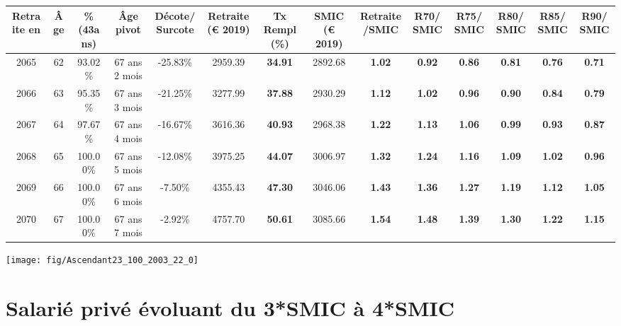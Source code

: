 \begin{adjustbox}{max width=\textwidth} 
\begin{tabular}[htb]{|c|c||c|c|c||c|c||c|c||c|c|c|c|c|} 
\hline 
 Retraite en &  Âge &  \%(43ans) &  Âge pivot &  Décote/Surcote &  Retraite (\euro{} 2019) &  Tx Rempl(\%) &  SMIC (\euro{} 2019) &  Retraite/SMIC &  R70/SMIC &  R75/SMIC &  R80/SMIC &  R85/SMIC &  R90/SMIC \\ 
\hline \hline 
 2065 &  62 &  93.02\% &  67 ans 2 mois &  -25.83\% &  2959.39 &  {\bf 34.91} &  2892.68 &  {\bf 1.02} &  {\bf {\color{red} 0.92}} &  {\bf {\color{red} 0.86}} &  {\bf {\color{red} 0.81}} &  {\bf {\color{red} 0.76}} &  {\bf {\color{red} 0.71}} \\ 
\hline 
 2066 &  63 &  95.35\% &  67 ans 3 mois &  -21.25\% &  3277.99 &  {\bf 37.88} &  2930.29 &  {\bf 1.12} &  {\bf 1.02} &  {\bf {\color{red} 0.96}} &  {\bf {\color{red} 0.90}} &  {\bf {\color{red} 0.84}} &  {\bf {\color{red} 0.79}} \\ 
\hline 
 2067 &  64 &  97.67\% &  67 ans 4 mois &  -16.67\% &  3616.36 &  {\bf 40.93} &  2968.38 &  {\bf 1.22} &  {\bf 1.13} &  {\bf 1.06} &  {\bf {\color{red} 0.99}} &  {\bf {\color{red} 0.93}} &  {\bf {\color{red} 0.87}} \\ 
\hline 
 2068 &  65 &  100.00\% &  67 ans 5 mois &  -12.08\% &  3975.25 &  {\bf 44.07} &  3006.97 &  {\bf 1.32} &  {\bf 1.24} &  {\bf 1.16} &  {\bf 1.09} &  {\bf 1.02} &  {\bf {\color{red} 0.96}} \\ 
\hline 
 2069 &  66 &  100.00\% &  67 ans 6 mois &  -7.50\% &  4355.43 &  {\bf 47.30} &  3046.06 &  {\bf 1.43} &  {\bf 1.36} &  {\bf 1.27} &  {\bf 1.19} &  {\bf 1.12} &  {\bf 1.05} \\ 
\hline 
 2070 &  67 &  100.00\% &  67 ans 7 mois &  -2.92\% &  4757.70 &  {\bf 50.61} &  3085.66 &  {\bf 1.54} &  {\bf 1.48} &  {\bf 1.39} &  {\bf 1.30} &  {\bf 1.22} &  {\bf 1.15} \\ 
\hline 
\hline 
\end{tabular} 
\end{adjustbox} 
 
 \vspace{0.1cm} 

 {\hspace{-2.2cm}\texttt{[image: fig/Ascendant23\_100\_2003\_22\_0]}} 

\newpage 
 
\chapter{Salarié privé évoluant du 3*SMIC à 4*SMIC} 

